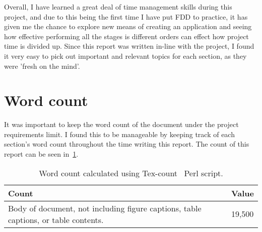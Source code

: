 Overall, I have learned a great deal of time management skills during this project, and due to this being the first time I have put FDD to practice, it has given me the chance to explore new means of creating an application and seeing how effective performing all the stages is different orders can effect how project time is divided up. Since this report was written in-line with the project, I found it very easy to pick out important and relevant topics for each section, as they were 'fresh on the mind'.

\section{Word count}
It was important to keep the word count of the document under the project requirements limit. I found this to be manageable by keeping track of each section's word count throughout the time writing this report. The count of this report can be seen in~\ref{tbl:count}.

\begin{table}[h!]
	\caption{Word count calculated using Tex-count~\cite{count} Perl script.}
	\begin{tabular}{|l|l|}
		\hline
		\textbf{Count} & \textbf{Value}                                                                \\ \hline
		Body of document, not including figure captions, table captions, or table contents.   &  19,500\\ \hline
	\end{tabular}
	\label{tbl:count}
\end{table}
